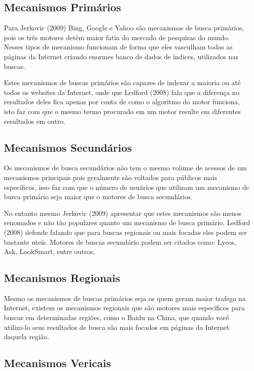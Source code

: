 \documentclass[
	12pt,				%
	openright,			%
	twoside,			%
	a4paper,			%
	english,			%
	french,				%
	spanish,			%
	brazil				%
	]{abntex2}
\begin{document}
\subsection{Mecanismos Primários}

Para Jerkovic (2009) Bing, Google e Yahoo são mecanismos de busca primários, pois os três motores detêm maior fatia do mercado de pesquisas do mundo. Nesses tipos de mecanismo funcionam de forma que eles vasculham todas as páginas da Internet criando enormes banco de dados de índices, utilizados nas buscas.

Estes mecanismos de buscas primários são capazes de indexar a maioria ou até todos os websites da Internet, onde que Ledford (2008) fala que a diferença no resultados deles fica apenas por conta de como o algoritmo do motor funciona, isto faz com que o mesmo termo procurado em um motor resulte em diferentes resultados em outro.

\subsection{Mecanismos Secundários}

Os mecanismos de busca secundários não tem o mesmo volume de acessos de um mecanismos principais pois geralmente são voltados para públicos mais específicos, isso faz com que o número de usuários que utilizam um mecanismo de busca primário seja maior que o motores de busca secundários.

No entanto mesmo Jerkovic (2009) apresentar que estes mecanismos são menos renomados e não tão populares quanto um mecanismo de busca primário, Ledford (2008) defende falando que para buscas regionais ou mais focadas eles podem ser bastante uteis. Motores de buscas secundário podem ser citados como: Lycos, Ask, LookSmart, entre outros. 

\subsection{Mecanismos Regionais}

Mesmo os mecanismos de buscas primários seja os quem geram maior trafego na Internet, existem os mecanismos regionais que são motores mais específicos para buscas em determinadas regiões, como o Baidu na China, que quando você utiliza-lo seus resultados de busca são mais focados em páginas da Internet daquela região.

\subsection{Mecanismos Vericais}
\end{document}
